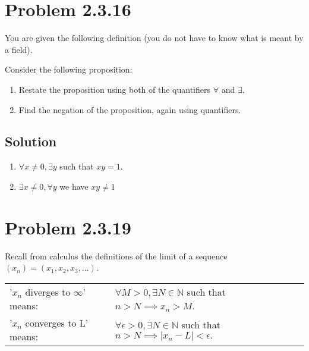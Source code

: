 \documentclass[12pt]{extarticle}
\begin{document}
\section*{Problem 2.3.16}

You are given the following definition (you do not have to know what is meant by a field). 


Consider the following proposition: 


\begin{enumerate}[label=(\alph*)]
	\item Restate the proposition using both of the quantifiers $\forall$ and $\exists$. 
	\item Find the negation of the proposition, again using quantifiers.
\end{enumerate}

\subsection*{Solution}

\begin{enumerate}[label=(\alph*)]
	\item $\forall x \neq 0, \exists y$ such that $xy = 1$.
	\item $\exists x \neq 0, \forall y$ we have $xy \neq 1$ 
\end{enumerate}

\section*{Problem 2.3.19}

Recall from calculus the definitions of the limit of a sequence $(x_{n}) = (x_{1}, x_{2}, x_{3},\ldots)$. 

\begin{table}[h!]
	\centering
	\begin{tabular}{l l}
		'$x_n$ diverges to $\infty$' means: & $\forall M > 0, \exists N \in \mathbb{N}$ such that $n > N \implies x_n > M$. \\
		'$x_n$ converges to L' means: & $\forall \epsilon > 0, \exists N \in \mathbb{N}$ such that $n > N \implies \mid x_n - L\mid  < \epsilon.$ 
	\end{tabular}
\end{table}
\end{document}

